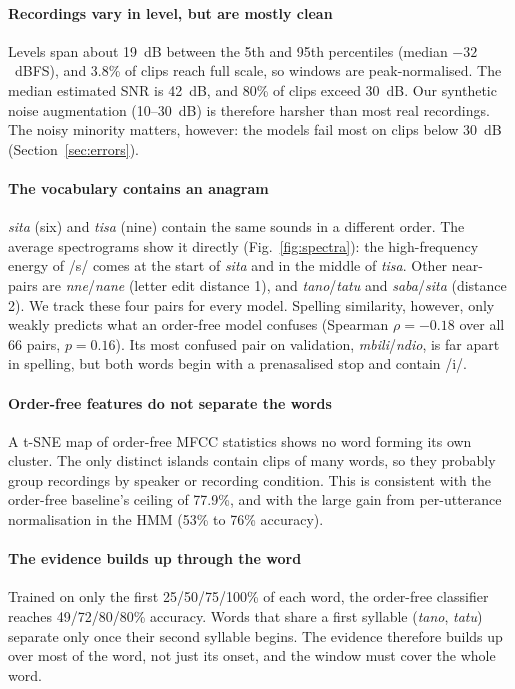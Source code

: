 \paragraph{Recordings vary in level, but are mostly clean}
Levels span about 19~dB between the 5th and 95th percentiles (median $-32$~dBFS), and 3.8\% of clips reach full
scale, so windows are peak-normalised. The median estimated SNR is 42~dB, and 80\% of clips exceed 30~dB. Our
synthetic noise augmentation (10--30~dB) is therefore harsher than most real recordings. The noisy minority matters,
however: the models fail most on clips below 30~dB (Section~\ref{sec:errors}).

\paragraph{The vocabulary contains an anagram}
\textit{sita} (six) and \textit{tisa} (nine) contain the same sounds in a different order. The average
spectrograms show it directly (Fig.~\ref{fig:spectra}): the high-frequency energy of /s/ comes at the start of
\textit{sita} and in the middle of \textit{tisa}. Other near-pairs are \textit{nne}/\textit{nane} (letter edit
distance 1), and \textit{tano}/\textit{tatu} and \textit{saba}/\textit{sita} (distance 2). We track these four
pairs for every model. Spelling similarity, however, only weakly predicts what an order-free model confuses
(Spearman $\rho=-0.18$ over all 66 pairs, $p=0.16$). Its most confused pair on validation, \textit{mbili}/\textit{ndio}, is far
apart in spelling, but both words begin with a prenasalised stop and contain /i/.

\paragraph{Order-free features do not separate the words}
A t-SNE map of order-free MFCC statistics shows no word forming its own cluster. The only distinct islands contain
clips of many words, so they probably group recordings by speaker or recording condition. This is consistent with
the order-free baseline's ceiling of 77.9\%, and with the large gain from per-utterance normalisation in the HMM
(53\% to 76\% accuracy).

\paragraph{The evidence builds up through the word}
Trained on only the first 25/50/75/100\% of each word, the order-free classifier reaches 49/72/80/80\% accuracy.
Words that share a first syllable (\textit{tano}, \textit{tatu}) separate only once their second syllable begins.
The evidence therefore builds up over most of the word, not just its onset, and the window must cover the whole
word.

